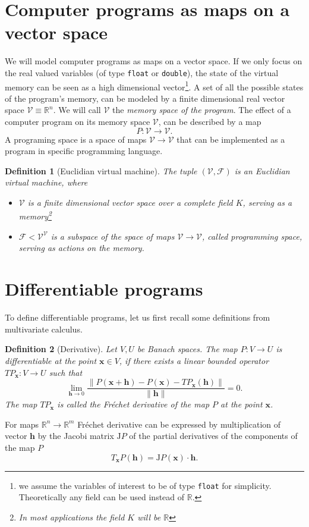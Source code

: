 \documentclass[smallcondensed]{svjour3}
\newcommand{\RR}{\mathbb{R}}
\newcommand{\VV}{\mathcal{V}}
\newcommand{\x}{\mathbf{x}}
\newcommand{\h}{\mathbf{h}}
\newcommand{\F}{\mathcal{F}}
\newtheorem{definicija}{Definition}[section]
\begin{document}
\section{Computer programs as maps on a vector space}
We will model computer programs as maps on a vector space. If
we only focus on the real valued variables (of type \texttt{float} or
\texttt{double}),  the state of the virtual memory can be seen as a high
dimensional vector\footnote{we assume the variables of interest to be of type \texttt{float} for
  simplicity. Theoretically any field can be used instead of $\RR$.}. 
A set of all the possible states of the program's memory,
can be modeled by a finite dimensional real vector space $\VV\equiv \RR^n$. We
will call $\VV$ the \emph{memory space of the program}. The effect of a computer
program on its memory space $\VV$, can be described by a map
\begin{equation}
  \label{eq:map}
  P:\VV\to \VV.
\end{equation}
A programing space is a space of maps $\VV\to\VV$ that can be implemented as a
program in specific programming language. 
\begin{definicija}[Euclidian virtual machine] The tuple $(\VV,\F)$ is an Euclidian virtual machine, where
  \begin{itemize}
  \item
  $\VV$ is a finite dimensional vector space over a complete field $K$, serving
  as a memory\footnote{In most applications the field $K$ will
    be $\RR$}
  \item
  $\F< \VV^\VV$ is a subspace of the space of maps $\VV\to \VV$, called \emph{programming space}, serving as actions on the memory.
  \end{itemize}  
\end{definicija}

\section{Differentiable programs}
To define differentiable programs, let us first recall some
definitions from multivariate calculus.
\begin{definicija}[Derivative]
  Let $V,U$ be Banach spaces. The map $P:V\to U$ is differentiable at the point
  $\x\in V$, if there exists a linear bounded operator $TP_\x:V\to U$ such that
  \begin{equation}
    \label{eq:frechet}
    \lim_{\h\to 0}\frac{\|P(\x+\h)-P(\x)-TP_\x(\h)\|}{\|\h\|} = 0.
  \end{equation}
  The map $TP_\x$ is called the \emph{Fréchet derivative} of the map $P$ at the
  point $\x$.
\end{definicija}
For maps $\RR^n\to \RR^m$ Fréchet derivative can be expressed by multiplication
of vector $\h$ by the Jacobi matrix $\mathrm{J} P$ of the  partial derivatives of the 
components of the map $P$
\begin{equation*}
  T_\x P(\h) = \mathrm{J} P(\x)\cdot \h.
\end{equation*}
\end{document}
